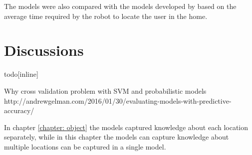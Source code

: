 
The models were also compared with the models developed by \cite{krajnik_wheres_2015}  based on the average time required by the robot to locate the user in the home.





\section{Discussions}


todo[inline]{

Why cross validation problem with SVM and probabilistic models \\
http://andrewgelman.com/2016/01/30/evaluating-models-with-predictive-accuracy/

}

In chapter \ref{chapter: object} the models captured knowledge about each location separately, while in this chapter the models can capture knowledge about multiple locations can be captured in a single model.






